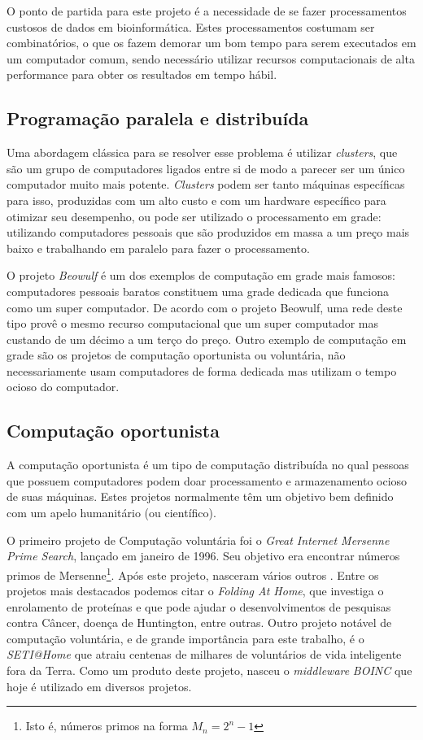
O ponto de partida para este projeto é a necessidade de se fazer processamentos custosos de 
dados em bioinformática. Estes processamentos costumam ser combinatórios, o que os fazem
demorar um bom tempo para serem executados em um computador comum, sendo necessário utilizar recursos
computacionais de alta performance para obter os resultados em tempo hábil.

\subsection{Programação paralela e distribuída}

Uma abordagem clássica para se resolver esse problema é utilizar \textit{clusters}, que são um grupo de computadores
ligados entre si de modo a parecer ser um único computador muito mais potente. \textit{Clusters} podem ser tanto máquinas
específicas para isso, produzidas com um alto custo e com um hardware específico para otimizar seu desempenho, ou 
pode ser utilizado o processamento em grade: utilizando computadores pessoais que são produzidos em massa a um preço mais baixo e 
trabalhando em paralelo para fazer o processamento. 

O projeto \emph{Beowulf} é um dos exemplos de computação em grade mais famosos: computadores pessoais baratos constituem uma grade dedicada 
que funciona como um super computador. De acordo com o projeto Beowulf, uma rede deste tipo provê o mesmo recurso computacional 
que um super computador mas custando de um décimo a um terço do preço. Outro exemplo de computação em grade são os 
projetos de computação oportunista ou voluntária, 
não necessariamente usam computadores de forma dedicada mas utilizam o tempo ocioso do computador.

\subsection{Computação oportunista}

A computação oportunista é um tipo de computação distribuída no qual pessoas que possuem computadores podem doar processamento e
armazenamento ocioso de suas máquinas. Estes projetos normalmente têm um objetivo bem definido com um apelo humanitário (ou científico).

O primeiro projeto de Computação voluntária foi o \textit{Great Internet Mersenne Prime Search}, lançado em janeiro de 1996. 
Seu objetivo era encontrar números primos de Mersenne\footnote{Isto é, números primos na forma $M_n = 2^n - 1$}. Após este projeto, nasceram vários outros 
. Entre os projetos mais destacados podemos citar 
o \textit{Folding At Home}, que investiga o enrolamento de proteínas e que pode ajudar o desenvolvimentos de pesquisas contra 
Câncer, doença de Huntington, entre outras. Outro projeto notável de computação voluntária, e de grande importância 
para este trabalho, é o \textit{SETI@Home} que atraiu centenas de milhares de voluntários 
de vida inteligente fora da Terra. Como um produto deste projeto, nasceu o \emph{middleware} 
\emph{BOINC} que hoje é utilizado em diversos projetos. 

